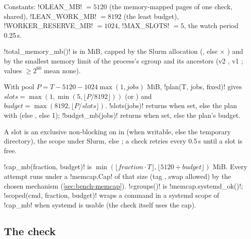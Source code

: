 Constants: \py!OLEAN_MB! $=5120$ (the memory-mapped  pages of one check, shared),
\py!LEAN_WORK_MB! $=8192$ (the least budget), \py!WORKER_RESERVE_MB! $=1024$, \py!MAX_SLOTS!
$=5$, the watch period 0.25\,s.

\py!total_memory_mb()! is  in MiB, capped by the Slurm allocation
(, else  $\times$ )
and by the smallest memory limit of the process's cgroup and its ancestors (v2
, v1 ; values $\ge 2^{60}$ mean none).

\begin{definition}
With pool $P = T - 5120 - 1024\max(1, \mathit{jobs})$ MiB, \py!plan(T, jobs, fixed)! gives
$\mathit{slots} = \max(1, \min(5, \lfloor P/8192\rfloor))$ (or ) and
$\mathit{budget} = \max(8192, \lfloor P/\mathit{slots}\rfloor)$. \py!slots(jobs)! returns
 when set, else the plan with  (else , else 1);
\py!budget_mb(jobs)! returns  when set, else the plan's budget.
\end{definition}

A slot is an exclusive non-blocking  on
 in  (when writable, else the
temporary directory), the scope  under Slurm, else
; a check retries every 0.5\,s until a slot is free.

\py!cap_mb(fraction, budget)! is $\min(\lfloor \mathit{fraction}\cdot T\rfloor, \lfloor 5120 +
\mathit{budget}\rfloor)$ MiB. Every attempt runs under a \py!memcap.Cap! of that size (tag
, swap allowed) by the chosen mechanism (\cref{sec:bench-memcap}).
\py!cgroups()! is \py!memcap.systemd_ok()!; \py!scoped(cmd, fraction, budget)! wraps a command
in a systemd scope of \py!cap_mb! when systemd is usable (the check itself uses the cap).

\subsection{The check}

